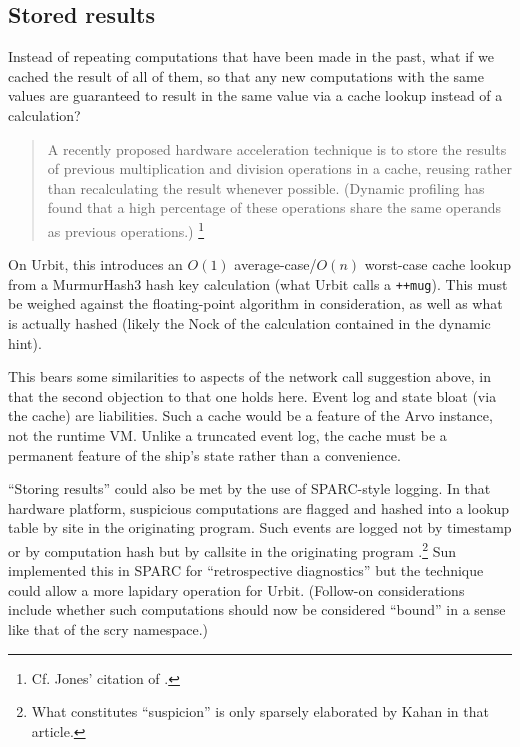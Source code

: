 \documentclass[twoside]{article}
\begin{document}
\subsection{Stored results}
\label{stored-results}

Instead of repeating computations that have been made in the past, what if we cached the result of all of them, so that any new computations with the same values are guaranteed to result in the same value via a cache lookup instead of a calculation?

\begin{quote}
A recently proposed hardware acceleration technique is to store the results of previous multiplication and division operations in a cache, reusing rather than recalculating the result whenever possible. (Dynamic profiling has found that a high percentage of these operations share the same operands as previous operations.)  \citep[p.~1148]{Jones2008}\footnote{Cf. Jones' citation of \citeauthor{Citron1998}.}
\end{quote}

On Urbit, this introduces an $O(1)$ average-case/$O(n)$ worst-case cache lookup from a MurmurHash3 hash key calculation (what Urbit calls a \texttt{++mug}).  This must be weighed against the floating-point algorithm in consideration, as well as what is actually hashed (likely the Nock of the calculation contained in the dynamic hint).

This bears some similarities to aspects of the network call suggestion above, in that the second objection to that one holds here.  Event log and state bloat (via the cache) are liabilities.  Such a cache would be a feature of the Arvo instance, not the runtime VM.  Unlike a truncated event log, the cache must be a permanent feature of the ship's state rather than a convenience.

“Storing results” could also be met by the use of SPARC-style logging.  In that hardware platform, suspicious computations are flagged and hashed into a lookup table by site in the originating program.  Such events are logged not by timestamp or by computation hash but by callsite in the originating program \citep[p.~6]{Kahan1997}.\footnote{What constitutes “suspicion” is only sparsely elaborated by Kahan in that article.}  Sun implemented this in SPARC for “retrospective diagnostics” but the technique could allow a more lapidary operation for Urbit.  (Follow-on considerations include whether such computations should now be considered “bound” in a sense like that of the scry namespace.)
\end{document}
